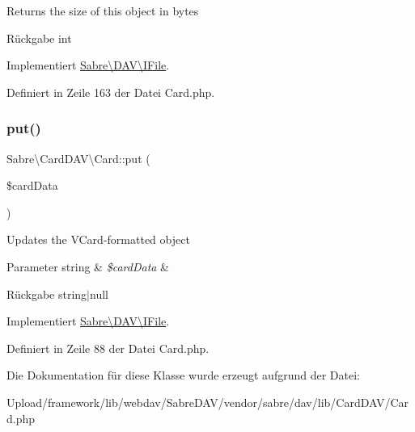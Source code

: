 Returns the size of this object in bytes

\begin{DoxyReturn}{Rückgabe}
int 
\end{DoxyReturn}


Implementiert \mbox{\hyperlink{interface_sabre_1_1_d_a_v_1_1_i_file_aa1534e00805f45d9282de9c699dbe178}{Sabre\textbackslash{}\+D\+A\+V\textbackslash{}\+I\+File}}.



Definiert in Zeile 163 der Datei Card.\+php.

\mbox{\label{class_sabre_1_1_card_d_a_v_1_1_card_aa302479ba1c1d8d216331aa61ad8d8df}} 
\subsubsection{\texorpdfstring{put()}{put()}}
{\footnotesize\ttfamily Sabre\textbackslash{}\+Card\+D\+A\+V\textbackslash{}\+Card\+::put (\begin{DoxyParamCaption}\item[{}]{\$card\+Data }\end{DoxyParamCaption})}

Updates the V\+Card-\/formatted object


\begin{DoxyParams}[1]{Parameter}
string & {\em \$card\+Data} & \\
\hline
\end{DoxyParams}
\begin{DoxyReturn}{Rückgabe}
string$\vert$null 
\end{DoxyReturn}


Implementiert \mbox{\hyperlink{interface_sabre_1_1_d_a_v_1_1_i_file_a0c30bc87b22d289f311c854f23993452}{Sabre\textbackslash{}\+D\+A\+V\textbackslash{}\+I\+File}}.



Definiert in Zeile 88 der Datei Card.\+php.



Die Dokumentation für diese Klasse wurde erzeugt aufgrund der Datei\+:\begin{DoxyCompactItemize}
\item 
Upload/framework/lib/webdav/\+Sabre\+D\+A\+V/vendor/sabre/dav/lib/\+Card\+D\+A\+V/Card.\+php\end{DoxyCompactItemize}
